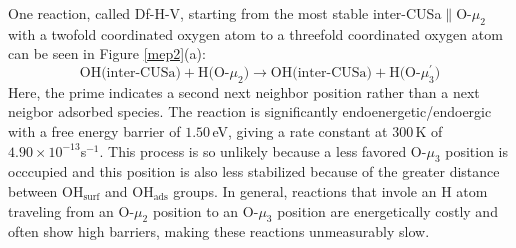 \documentclass[11pt,DIV=13,BCOR=5mm,a4paper,headinclude]{scrbook}
\begin{document}
One reaction, called Df-H-V, starting from the most stable inter-CUSa$\parallel$O-$\mu_2$ with a twofold coordinated oxygen atom to a threefold coordinated oxygen atom can be seen in Figure \ref{mep2}(a):
\begin{equation}
 \text{OH(inter-CUSa)} + \text{H(O-$\mu_2$)} \rightarrow \text{OH(inter-CUSa)} + \text{H(O-$\mu_3^\prime$)} \tag{Df-H-V}
     \label{diffHV}
\end{equation}
Here, the prime indicates a second next neighbor position rather than a next neigbor adsorbed species.
The reaction is significantly endoenergetic/endoergic with a free energy barrier of $1.50\,$eV, giving a rate constant at $300\,$K of $4.90\times 10^{-13}$s$^{-1}$.
This process is so unlikely because a less favored O-$\mu_3$ position is occcupied and this position is also less stabilized because of the greater distance between OH$_{\text{surf}}$ and OH$_{\text{ads}}$ groups.
In general, reactions that invole an H atom traveling from an O-$\mu_2$ position to an O-$\mu_3$ position are energetically costly and often show high barriers, making these reactions unmeasurably slow.

\end{document}

